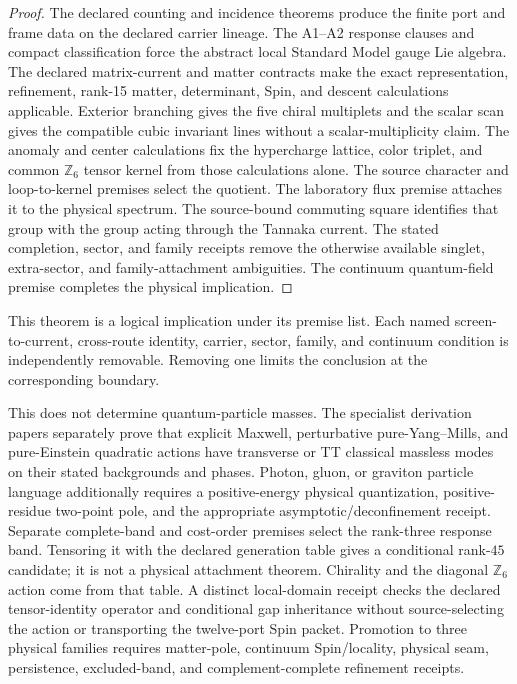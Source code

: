 \begin{proof}
The declared counting and incidence theorems produce the finite port and frame
data on the declared carrier lineage. The A1--A2 response clauses and compact
classification force the abstract local Standard Model gauge Lie algebra. The declared matrix-current and
matter contracts make the exact representation, refinement, rank-15 matter,
determinant, Spin, and descent calculations applicable. Exterior branching
gives the five chiral multiplets
and the scalar scan gives the compatible cubic invariant lines without a
scalar-multiplicity claim. The anomaly and center calculations fix
the hypercharge lattice, color triplet, and common \(\mathbb Z_6\) tensor
kernel from those calculations alone. The source character and
loop-to-kernel premises select the quotient. The laboratory flux premise
attaches it to the physical spectrum. The source-bound commuting square
identifies that group with the group
acting through the Tannaka current. The stated completion, sector, and family receipts remove
the otherwise available singlet, extra-sector, and family-attachment
ambiguities. The continuum quantum-field premise completes the physical implication.
\end{proof}

This theorem is a logical implication under its premise list. Each named
screen-to-current, cross-route identity, carrier, sector, family, and continuum
condition is independently removable. Removing one limits the conclusion at
the corresponding boundary.

This does not determine quantum-particle masses. The specialist derivation papers separately prove that explicit
Maxwell, perturbative pure-Yang--Mills, and pure-Einstein quadratic actions have transverse or TT
classical massless modes on their stated backgrounds and phases. Photon, gluon, or graviton
particle language additionally requires a positive-energy physical quantization, positive-residue
two-point pole, and the appropriate asymptotic/deconfinement receipt.
Separate complete-band and cost-order premises select the rank-three response
band. Tensoring it with the declared generation table gives a conditional
rank-\(45\) candidate; it is not a physical attachment theorem. Chirality and
the diagonal \(\mathbb Z_6\) action come from that table. A distinct
local-domain receipt checks the declared tensor-identity operator and
conditional gap inheritance without source-selecting the action or
transporting the twelve-port Spin packet. Promotion to three physical
families requires matter-pole, continuum Spin/locality, physical seam,
persistence, excluded-band, and complement-complete refinement receipts.

